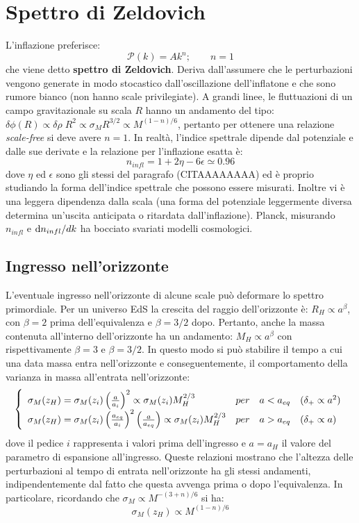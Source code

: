 \section{Spettro di Zeldovich}
L'inflazione preferisce:
$$
\mathcal{P}(k) = Ak^n; \qquad n=1
$$
che viene detto \textbf{spettro di Zeldovich}. Deriva dall'assumere che le perturbazioni vengono generate in modo stocastico dall'oscillazione dell'inflatone e che sono rumore bianco (non hanno scale privilegiate).  A grandi linee, le fluttuazioni di un campo gravitazionale su scala $R$ hanno un andamento del tipo: $\delta \phi (R) \propto \delta \rho \; R^2 \propto \sigma_M R^{3/2} \propto M^{(1-n)/6}$, pertanto per ottenere una relazione \textit{scale-free} si deve avere $n=1$. In realtà, l'indice spettrale dipende dal potenziale e dalle sue derivate e la relazione per l'inflazione esatta è:
\begin{equation}
    n_{infl}=1+2\eta -6\epsilon \simeq 0.96
\end{equation}
dove $\eta$ ed $\epsilon$ sono gli stessi del paragrafo (CITAAAAAAAA) ed è proprio studiando la forma dell'indice spettrale che possono essere misurati. Inoltre vi è una leggera dipendenza dalla scala (una forma del potenziale leggermente diversa determina un'uscita anticipata o ritardata dall'inflazione). Planck, misurando $n_{infl}$ e $\operatorname{d}\!{n_{infl}}/d{k}$ ha bocciato svariati modelli cosmologici.

\subsection{Ingresso nell'orizzonte}
L'eventuale ingresso nell'orizzonte di alcune scale può deformare lo spettro primordiale. Per un universo EdS la crescita del raggio dell'orizzonte è: $R_H\propto a^\beta$, con $\beta = 2$ prima dell'equivalenza e $\beta =3/2$ dopo. Pertanto, anche la massa contenuta all'interno dell'orizzonte ha un andamento: $M_H\propto a^\beta$ con rispettivamente $\beta=3$ e $\beta=3/2$. In questo modo si può stabilire il tempo a cui una data massa entra nell'orizzonte e conseguentemente, il comportamento della varianza in massa all'entrata nell'orizzonte:
\begin{equation}\left\{
    \def\arraystretch{1.5}
        \begin{array}{llll}
        \sigma_M (z_H) = \sigma_M (z_i) \left(\frac{a}{a_{i}}\right)^2\propto \sigma_M (z_i)  M_H^{2/3} & per & a < a_{eq} &  (\delta_+ \propto a^2) \\
        \sigma_M (z_H) = \sigma_M (z_i) \left(\frac{a_{eq}}{a_{i}}\right)^2\left(\frac{a}{a_{eq}}\right)\propto \sigma_M (z_i)  M_H^{2/3} & per & a > a_{eq} &  (\delta_+ \propto a)
    \end{array}\right. \label{eq8:primadopoh}
\end{equation}
dove il pedice $i$ rappresenta i valori prima dell'ingresso e $a=a_H$ il valore del parametro di espansione all'ingresso. Queste relazioni mostrano che l'altezza delle perturbazioni al tempo di entrata nell'orizzonte ha gli stessi andamenti, indipendentemente dal fatto che questa avvenga prima o dopo l'equivalenza. In particolare, ricordando che $\sigma_M \propto M^{-(3+n)/6}$ si ha: 
$$
\sigma_M (z_H) \propto M^{(1-n)/6}
$$

